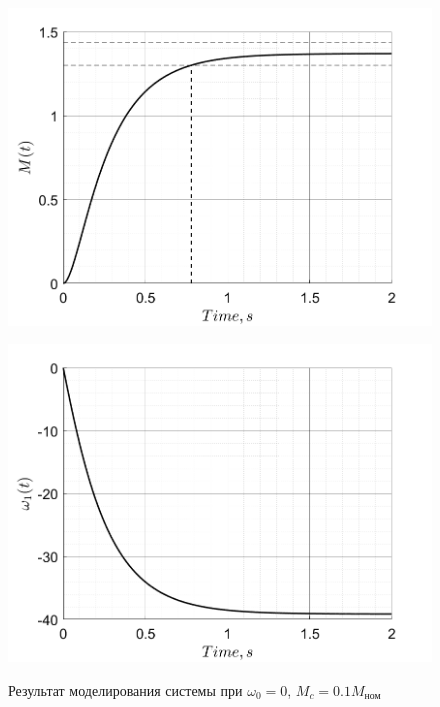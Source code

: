 \begin{figure}[!h]
    \centering
    \begin{minipage}{0.5\textwidth}
        \centering
        \includegraphics[width = \textwidth]{img/task12_M}
        \label{fig:img/task12_M}
    \end{minipage}%
    \begin{minipage}{0.5\textwidth}
        \centering
        \includegraphics[width = \textwidth]{img/task12_omega1}
        \label{fig:img/task12_omega1}
    \end{minipage}%
    \caption{Результат моделирования системы при $\omega_0 = 0$, $M_c = 0.1M_\text{ном}$}
\end{figure}

